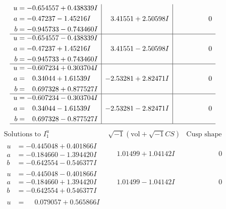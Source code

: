 \documentclass[1p]{elsarticle_modified}
\theoremstyle{definition}
\newcommand{\I}{\sqrt{-1}}
\begin{document}
$$\begin{array}{c|c|c}
\begin{aligned}
u &= -0.654557 + 0.438339 I \\
a &= -0.47237 - 1.45216 I \\
b &= -0.945733 - 0.743460 I\end{aligned}
 & \phantom{-}3.41551 + 2.50598 I & \phantom{-0.000000 } 0 \\ \hline\begin{aligned}
u &= -0.654557 - 0.438339 I \\
a &= -0.47237 + 1.45216 I \\
b &= -0.945733 + 0.743460 I\end{aligned}
 & \phantom{-}3.41551 - 2.50598 I & \phantom{-0.000000 } 0 \\ \hline\begin{aligned}
u &= -0.607234 + 0.303704 I \\
a &= \phantom{-}0.34044 + 1.61539 I \\
b &= \phantom{-}0.697328 + 0.877527 I\end{aligned}
 & -2.53281 + 2.82471 I & \phantom{-0.000000 } 0 \\ \hline\begin{aligned}
u &= -0.607234 - 0.303704 I \\
a &= \phantom{-}0.34044 - 1.61539 I \\
b &= \phantom{-}0.697328 - 0.877527 I\end{aligned}
 & -2.53281 - 2.82471 I & \phantom{-0.000000 } 0\\
 \hline 
 \end{array}$$\newpage$$\begin{array}{c|c|c}  
\text{Solutions to }I^u_{1}& \I (\text{vol} + \sqrt{-1}CS) & \text{Cusp shape}\\
 \hline 
\begin{aligned}
u &= -0.445048 + 0.401866 I \\
a &= -0.184660 - 1.394420 I \\
b &= -0.642554 - 0.546377 I\end{aligned}
 & \phantom{-}1.01499 + 1.04142 I & \phantom{-0.000000 } 0 \\ \hline\begin{aligned}
u &= -0.445048 - 0.401866 I \\
a &= -0.184660 + 1.394420 I \\
b &= -0.642554 + 0.546377 I\end{aligned}
 & \phantom{-}1.01499 - 1.04142 I & \phantom{-0.000000 } 0 \\ \hline\begin{aligned}
u &= \phantom{-}0.079057 + 0.565866 I \\

\end{aligned}
\end{array}$$
\end{document}
